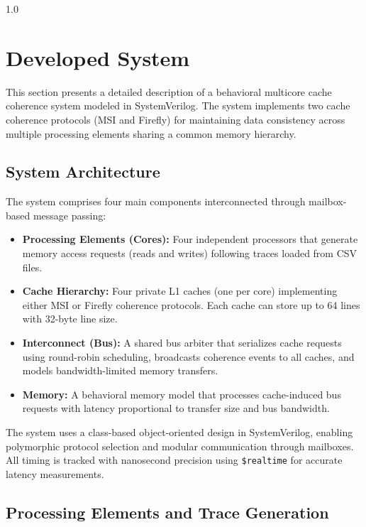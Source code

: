 \documentclass[12pt]{article}
\begin{document}
\newpage
\begin{spacing}{1.0} %
\section{Developed System}

This section presents a detailed description of a behavioral multicore cache coherence system modeled in SystemVerilog. The system implements two cache coherence protocols (MSI and Firefly) for maintaining data consistency across multiple processing elements sharing a common memory hierarchy.

\subsection{System Architecture}

The system comprises four main components interconnected through mailbox-based message passing:

\begin{itemize}
    \item \textbf{Processing Elements (Cores):} Four independent processors that generate memory access requests (reads and writes) following traces loaded from CSV files.
    
    \item \textbf{Cache Hierarchy:} Four private L1 caches (one per core) implementing either MSI or Firefly coherence protocols. Each cache can store up to 64 lines with 32-byte line size.
    
    \item \textbf{Interconnect (Bus):} A shared bus arbiter that serializes cache requests using round-robin scheduling, broadcasts coherence events to all caches, and models bandwidth-limited memory transfers.
    
    \item \textbf{Memory:} A behavioral memory model that processes cache-induced bus requests with latency proportional to transfer size and bus bandwidth.
\end{itemize}

The system uses a class-based object-oriented design in SystemVerilog, enabling polymorphic protocol selection and modular communication through mailboxes. All timing is tracked with nanosecond precision using \texttt{\$realtime} for accurate latency measurements.

\subsection{Processing Elements and Trace Generation}


\end{spacing}
\end{document}
